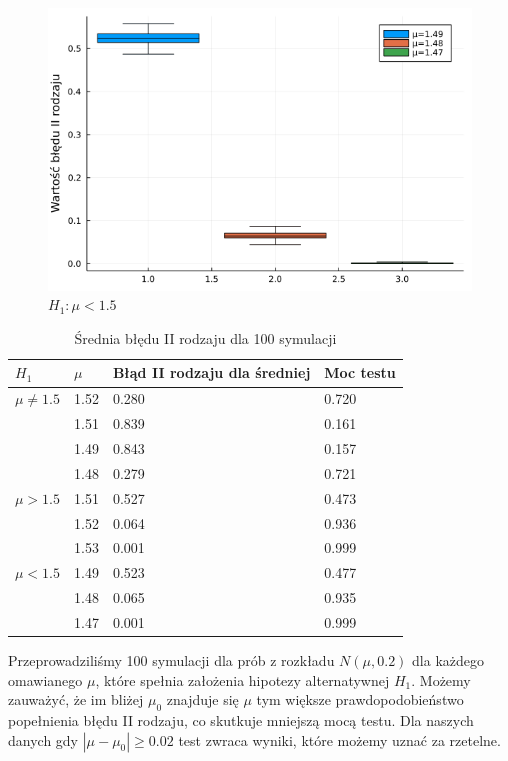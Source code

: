 \documentclass{article}
\theoremstyle{break}
\begin{document}
\begin{figure}[H]
	\begin{center}
		\includegraphics[scale=0.5]{Z3.mu3.png}
		\caption{$H_1: \mu<1.5$}
	\end{center}
\end{figure}

\begin{table}[H]
\begin{center}
	\begin{tabular}{|l|l|l|l|}
		\hline
		\rowcolor[HTML]{EFEFEF}
		$H_1$                     & $\mu$   & Błąd II rodzaju dla średniej & Moc testu   \\ \hline
		{$\mu\ne1.5$}            			& 1.52 & 0.280                    & 0.720 \\ \cline{2-4} 
		& 1.51 & 0.839                        & 0.161 \\ \cline{2-4} 
		& 1.49 & 0.843                        & 0.157 \\ \cline{2-4} 
		& 1.48 & 0.279                        & 0.721 \\ \hline
		{$\mu>1.5$} 			& 1.51 & 0.527                        & 0.473 \\ \cline{2-4} 
		& 1.52 & 0.064                        & 0.936 \\ \cline{2-4} 
		& 1.53 & 0.001                        & 0.999 \\ \hline
		{$\mu<1.5$}   			 & 1.49 & 0.523                        & 0.477 \\ \cline{2-4} 
		& 1.48 & 0.065                        & 0.935 \\ \cline{2-4} 
		& 1.47 & 0.001                        & 0.999 \\ \hline
	\end{tabular}
\caption{Średnia błędu II rodzaju dla 100 symulacji}
\end{center}
\end{table}
Przeprowadziliśmy 100 symulacji dla prób z rozkładu $N(\mu,0.2)$ dla każdego omawianego $\mu$, które spełnia założenia hipotezy alternatywnej $H_1$. Możemy zauważyć, że im bliżej $\mu_0$ znajduje się $\mu$ tym większe prawdopodobieństwo popełnienia błędu II rodzaju, co skutkuje mniejszą mocą testu. Dla naszych danych gdy $|\mu-\mu_0|\geq 0.02$ test zwraca wyniki, które możemy uznać za rzetelne.
\end{document}
